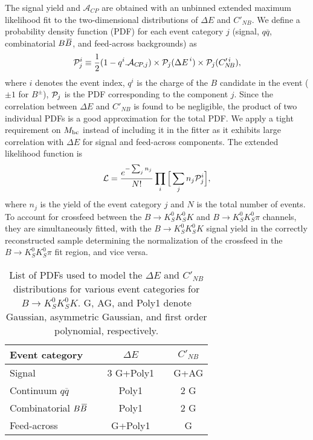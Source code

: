 \documentclass[aps,prl,preprint,tightenlines,superscriptaddress,,amsmath,byrevtex]{revtex4}
\def\qqbar  {\ensuremath{q\overline q}\xspace}
\def\KS     {\ensuremath{K^0_{\scriptscriptstyle S}}\xspace}
\def\Bbar   {\kern 0.18em\overline{\kern -0.18em B}{}\xspace}
\def\BB     {\ensuremath{B\Bbar}\xspace}
\def\Bpm    {\ensuremath{B^{\pm}}\xspace}
\def\mbc    {\mbox{$M_{\rm bc}$}\xspace}
\def\DeltaE {\mbox{$\Delta E$}\xspace}
\def\to{\ensuremath{\rightarrow}\xspace}
\def\CP {\ensuremath{C\!P}\xspace}
\def\ACP{{\ensuremath{\mathcal{A}_{\CP}}\xspace}}
\def\nb    {\ensuremath{C_{N\!B}}\xspace}
\def\nbprim{\ensuremath{C'_{N\!B}}\xspace}
\begin{document}
The signal yield and $\ACP$ are obtained with an unbinned extended maximum 
likelihood fit to the two-dimensional distributions of $\DeltaE$ and $\nbprim$. 
We define a probability density function (PDF) for each event category $j$
(signal, $\qqbar$, combinatorial $\BB$, and feed-across backgrounds) as 
\begin{eqnarray}
  {\cal P}_{j}^{i}\equiv\dfrac{1}{2} (1-q^{i}.{\ensuremath{\mathcal{A}_{\CP ,j}}})\times {\cal P}_j(\DeltaE^{\,i})\times{\cal P}_j(\nb'^{\,i}),
\end{eqnarray} 
where $i$ denotes the event index, $q^{i}$ is the charge of the $B$ candidate in the event 
($\pm 1$ for $\Bpm$), ${\cal P}_{j}$ is the PDF corresponding to the 
component $j$.  Since the correlation between $\DeltaE$ and $\nbprim$ is found to be negligible, the product of two individual PDFs is a good approximation for the total PDF. We apply a tight requirement on $\mbc$ 
instead of including it in the fitter as it exhibits large correlation with $\DeltaE$ for signal and feed-across components. 
The extended likelihood function is
\begin{eqnarray}
{\cal L} = \dfrac{e^{-\sum_{j} n_{j}}}{N!} \prod_{i} \Big[\sum_{j} n_{j} \mathcal{P}_{j}^{i} \Big],
\end{eqnarray}
where $n_j$ is the yield of the event category $j$ and $N$ is the total number of events. To account for  crossfeed  between the  $B\to\KS\KS K$ and  $B\to\KS\KS \pi$  channels, they are simultaneously fitted, with the $B\to\KS\KS K$  signal yield in the correctly reconstructed sample determining the normalization of the crossfeed in the $B\to\KS\KS \pi$ fit region, and vice versa. 

\begin{table}[htb]
\centering
\caption{List of PDFs used to model the $\DeltaE$ and $\nbprim$
distributions for various event categories for $B\to\KS\KS K$. G, AG, 
and Poly1 denote Gaussian, asymmetric Gaussian, and first order polynomial, respectively.\\}
\label{tab:pdf-shape}
\begin{tabular}{lcccc}
\hline\hline
Event category & & $\DeltaE$ & & $\nbprim$ \\
\hline
Signal & & 3 G+Poly1 & & G+AG \\
Continuum $\qqbar$ & & Poly1 & & 2 G \\
Combinatorial $\BB$ & & Poly1 & & 2 G \\
Feed-across & & G+Poly1 & & G \\
\hline\hline
\end{tabular}
\end{table} 
\end{document}
